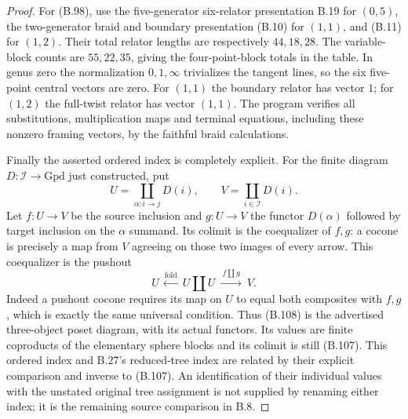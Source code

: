 \begin{proof}
For (B.98), use the five-generator six-relator presentation
B.19 for $(0,5)$, the two-generator braid and boundary
presentation (B.10) for $(1,1)$, and (B.11) for $(1,2)$.
Their total relator lengths are respectively $44,18,28$.
The variable-block counts are $55,22,35$, giving the
four-point-block totals in the table.  In genus zero the
normalization $0,1,\infty$ trivializes the tangent lines,
so the six five-point central vectors are zero.  For
$(1,1)$ the boundary relator has vector $1$; for $(1,2)$
the full-twist relator has vector $(1,1)$.  The program
verifies all substitutions, multiplication maps and
terminal equations, including these nonzero framing
vectors, by the faithful braid calculations.

Finally the asserted ordered index is completely explicit.
For the finite diagram $D:\mathcal I\to\mathrm{Gpd}$ just
constructed, put
\[
 U=\coprod_{\alpha:i\to j}D(i),\qquad
 V=\coprod_{i\in\mathcal I}D(i).
\]
Let $f:U\to V$ be the source inclusion and $g:U\to V$ the
functor $D(\alpha)$ followed by target inclusion on the
$\alpha$ summand.  Its colimit is the coequalizer of $f,g$:
a cocone is precisely a map from $V$ agreeing on those two
images of every arrow.  This coequalizer is the pushout
\[
       U\ \xleftarrow{\mathrm{fold}}\ U\amalg U
           \ \xrightarrow{\ f\amalg g\ }\ V.                 \tag{B.108}
\]
Indeed a pushout cocone requires its map on $U$ to equal
both composites with $f,g$, which is exactly the same
universal condition.  Thus (B.108) is the advertised
three-object poset diagram, with its actual functors.
Its values are finite coproducts of the elementary sphere
blocks and its colimit is still (B.107).  This ordered
index and B.27's reduced-tree index are related by their
explicit comparison and inverse to (B.107).  An
identification of their individual values with the
unstated original tree assignment is not supplied by
renaming either index; it is the remaining source
comparison in B.8.
\end{proof}
